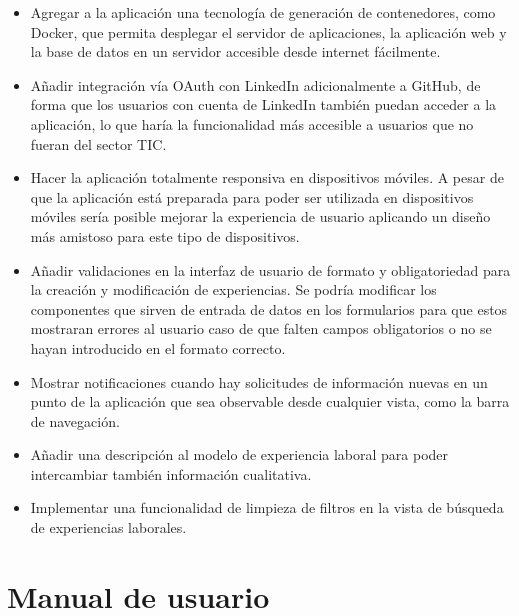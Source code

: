 \documentclass[a4paper, 12pt]{book}
\begin{document}
    \begin{itemize}
        \item Agregar a la aplicación una tecnología de generación de contenedores, como Docker, que permita desplegar
        el servidor de aplicaciones, la aplicación web y la base de datos en un servidor accesible desde internet fácilmente.
        \item Añadir integración vía OAuth con LinkedIn adicionalmente a GitHub, de forma que los usuarios con cuenta de LinkedIn también puedan acceder a la aplicación,
        lo que haría la funcionalidad más accesible a usuarios que no fueran del sector TIC.
        \item Hacer la aplicación totalmente responsiva en dispositivos móviles.
        A pesar de que la aplicación está preparada para poder ser utilizada en dispositivos móviles sería posible mejorar la experiencia de usuario
        aplicando un diseño más amistoso para este tipo de dispositivos.
        \item Añadir validaciones en la interfaz de usuario de formato y obligatoriedad para la creación y modificación de experiencias.
        Se podría modificar los componentes que sirven de entrada de datos en los formularios para que estos mostraran errores al usuario
        caso de que falten campos obligatorios o no se hayan introducido en el formato correcto.
        \item Mostrar notificaciones cuando hay solicitudes de información nuevas en un punto de la aplicación que sea observable desde cualquier vista, como la barra de navegación.
        \item Añadir una descripción al modelo de experiencia laboral para poder intercambiar también información cualitativa.
        \item Implementar una funcionalidad de limpieza de filtros en la vista de búsqueda de experiencias laborales.
    \end{itemize}



    \cleardoublepage
    \appendix


    \chapter{Manual de usuario}
    \label{app:manual}
\end{document}
